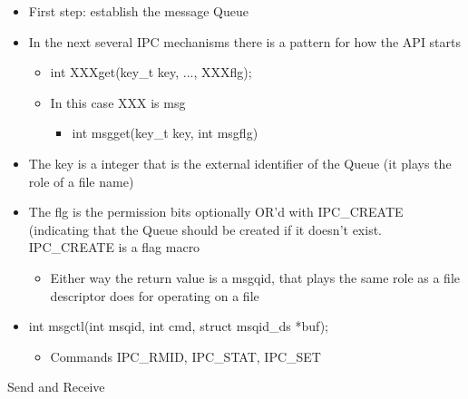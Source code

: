 \begin{itemize}
    \item First step: establish the message Queue
    \item In the next several IPC mechanisms there is a pattern for how the API starts
    \begin{itemize}
        \item int XXXget(key\_t key, ..., XXXflg);
        \item In this case XXX is msg
        \begin{itemize}
            \item int msgget(key\_t key, int msgflg)
        \end{itemize}
    \end{itemize}
    \item The key is a integer that is the external identifier of the Queue (it plays the role of a file name)
    \item The flg is the permission bits optionally OR'd with IPC\_CREATE (indicating that the Queue should be created if it doesn't exist. IPC\_CREATE is a flag macro
    \begin{itemize}
        \item Either way the return value is a msgqid, that plays the same role as a file descriptor does for operating on a file
    \end{itemize}
    \item int msgctl(int msqid, int cmd, struct msqid\_ds *buf);
    \begin{itemize}
        \item Commands IPC\_RMID, IPC\_STAT, IPC\_SET
    \end{itemize}
\end{itemize}
Send and Receive

